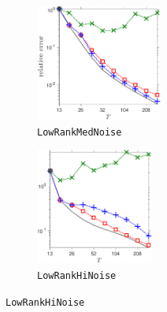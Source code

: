 \documentclass[final]{siamart1116}
\numberwithin{equation}{section}
\numberwithin{theorem}{section}
\numberwithin{figure}{section}
\begin{document}
\begin{figure}[htp!]
\begin{center}
\begin{subfigure}{.325\textwidth}
\begin{center}
\includegraphics[height=1.5in]{figures/MED.pdf}
\caption{\texttt{LowRankMedNoise}}
\label{fig:MED-theory}
\end{center}
\end{subfigure}
\begin{subfigure}{.325\textwidth}
\begin{center}
\includegraphics[height=1.5in]{figures/HI.pdf}
\caption{\texttt{LowRankHiNoise}}
\label{fig:HI-theory}
\end{center}
\end{subfigure}
\end{center}

\vspace{.5em}


\end{figure}
\end{document}
